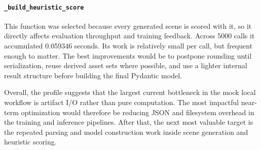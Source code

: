 \documentclass{article}
\begin{document}
\paragraph{\texttt{\_build\_heuristic\_score}}
This function was selected because every generated scene is scored with it, so it directly affects evaluation throughput and training feedback. Across 5000 calls it accumulated 0.059346 seconds. Its work is relatively small per call, but frequent enough to matter. The best improvements would be to postpone rounding until serialization, reuse derived asset sets where possible, and use a lighter internal result structure before building the final Pydantic model.

Overall, the profile suggests that the largest current bottleneck in the mock local workflow is artifact I/O rather than pure computation. The most impactful near-term optimization would therefore be reducing JSON and filesystem overhead in the training and inference pipelines. After that, the next most valuable target is the repeated parsing and model construction work inside scene generation and heuristic scoring.
\end{document}
